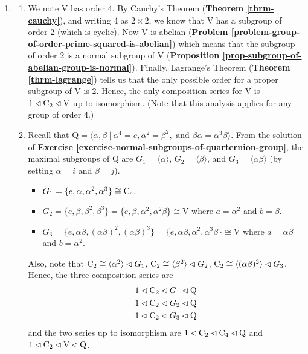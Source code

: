 \begin{enumerate}
    \item \begin{enumerate}[label=(\roman*)]
        \item We note $\mathrm{V}$ has order 4. By Cauchy's Theorem (\textbf{Theorem \ref{thrm-cauchy}}), and writing 4 as $2 \times 2$, we know that $\mathrm{V}$ has a subgroup of order 2 (which is cyclic). Now $\mathrm{V}$ is abelian (\textbf{Problem \ref{problem-group-of-order-prime-squared-is-abelian}}) which means that the subgroup of order 2 is a normal subgroup of $\mathrm{V}$ (\textbf{Proposition \ref{prop-subgroup-of-abelian-group-is-normal}}). Finally, Lagrange's Theorem (\textbf{Theorem \ref{thrm-lagrange}}) tells us that the only possible order for a proper subgroup of $\mathrm{V}$ is 2. Hence, the only composition series for $\mathrm{V}$ is $1 \lhd \mathrm{C}_{2} \lhd \mathrm{V}$ up to isomorphism.\newline
        (Note that this analysis applies for any group of order 4.)
        
        \item Recall that $\mathrm{Q} = \langle \alpha, \beta \ | \ \alpha^4 = e, \alpha^2 = \beta^2, \text{ and } \beta\alpha = \alpha^3\beta \rangle$. From the solution of \textbf{Exercise \ref{exercise-normal-subgroups-of-quarternion-group}}, the maximal subgroups of $\mathrm{Q}$ are $G_1 = \langle \alpha \rangle$, $G_2 = \langle \beta \rangle$, and $G_3 = \langle \alpha\beta \rangle$ (by setting $\alpha = i$ and $\beta = j$).
        \begin{itemize}
            \item $G_1 = \{e, \alpha, \alpha^2, \alpha^3\} \cong \mathrm{C}_{4}$.
            \item $G_2 = \{e, \beta, \beta^2, \beta^3\} = \{e, \beta, \alpha^2, \alpha^2\beta\} \cong \mathrm{V}$ where $a = \alpha^2$ and $b = \beta$.
            \item $G_3 = \{e, \alpha\beta, (\alpha\beta)^2, (\alpha\beta)^3\} = \{e, \alpha\beta, \alpha^2, \alpha^3\beta\} \cong \mathrm{V}$ where $a = \alpha\beta$ and $b = \alpha^2$.
        \end{itemize}
        Also, note that $\mathrm{C}_{2} \cong \langle \alpha^2 \rangle \lhd G_1$, $\mathrm{C}_{2} \cong \langle \beta^2 \rangle \lhd G_2$, $\mathrm{C}_{2} \cong \langle (\alpha\beta)^2 \rangle \lhd G_3$. Hence, the three composition series are
        \begin{align*}
            &1 \lhd \mathrm{C}_{2} \lhd G_1 \lhd \mathrm{Q}\\
            &1 \lhd \mathrm{C}_{2} \lhd G_2 \lhd \mathrm{Q}\\
            &1 \lhd \mathrm{C}_{2} \lhd G_3 \lhd \mathrm{Q}
        \end{align*}
        and the two series up to isomorphism are $1 \lhd \mathrm{C}_{2} \lhd \mathrm{C}_{4} \lhd \mathrm{Q}$ and $1 \lhd \mathrm{C}_{2} \lhd \mathrm{V} \lhd \mathrm{Q}$.
        

\end{enumerate}
\end{enumerate}
